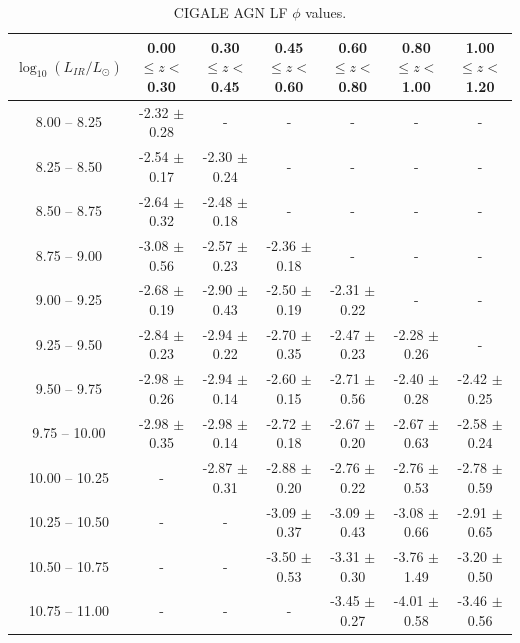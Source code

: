 \begin{landscape}
    \begin{table}
    \begin{center}
    \caption{CIGALE AGN LF $\phi$ values.}
    \label{Tab: CG AGN LF}
    \begin{tabular}{@{}ccccccc@{}}
        \toprule
        $\log_{10}(L_{IR}/L_{\odot})$ & 0.00 $\leq z <$ 0.30 & 0.30 $\leq z <$ 0.45 & 0.45 $\leq z <$ 0.60 & 0.60 $\leq z <$ 0.80 & 0.80 $\leq z <$ 1.00 & 1.00 $\leq z <$ 1.20 \\
        \hline
         8.00 --  8.25 & -2.32 $\pm$ 0.28 & -                & -                & -                & -                & - \\
         8.25 --  8.50 & -2.54 $\pm$ 0.17 & -2.30 $\pm$ 0.24 & -                & -                & -                & - \\
         8.50 --  8.75 & -2.64 $\pm$ 0.32 & -2.48 $\pm$ 0.18 & -                & -                & -                & - \\
         8.75 --  9.00 & -3.08 $\pm$ 0.56 & -2.57 $\pm$ 0.23 & -2.36 $\pm$ 0.18 & -                & -                & - \\
         9.00 --  9.25 & -2.68 $\pm$ 0.19 & -2.90 $\pm$ 0.43 & -2.50 $\pm$ 0.19 & -2.31 $\pm$ 0.22 & -                & - \\
         9.25 --  9.50 & -2.84 $\pm$ 0.23 & -2.94 $\pm$ 0.22 & -2.70 $\pm$ 0.35 & -2.47 $\pm$ 0.23 & -2.28 $\pm$ 0.26 & - \\
         9.50 --  9.75 & -2.98 $\pm$ 0.26 & -2.94 $\pm$ 0.14 & -2.60 $\pm$ 0.15 & -2.71 $\pm$ 0.56 & -2.40 $\pm$ 0.28 & -2.42 $\pm$ 0.25 \\
         9.75 -- 10.00 & -2.98 $\pm$ 0.35 & -2.98 $\pm$ 0.14 & -2.72 $\pm$ 0.18 & -2.67 $\pm$ 0.20 & -2.67 $\pm$ 0.63 & -2.58 $\pm$ 0.24 \\
        10.00 -- 10.25 & -                & -2.87 $\pm$ 0.31 & -2.88 $\pm$ 0.20 & -2.76 $\pm$ 0.22 & -2.76 $\pm$ 0.53 & -2.78 $\pm$ 0.59 \\
        10.25 -- 10.50 & -                & -                & -3.09 $\pm$ 0.37 & -3.09 $\pm$ 0.43 & -3.08 $\pm$ 0.66 & -2.91 $\pm$ 0.65 \\
        10.50 -- 10.75 & -                & -                & -3.50 $\pm$ 0.53 & -3.31 $\pm$ 0.30 & -3.76 $\pm$ 1.49 & -3.20 $\pm$ 0.50 \\
        10.75 -- 11.00 & -                & -                & -                & -3.45 $\pm$ 0.27 & -4.01 $\pm$ 0.58 & -3.46 $\pm$ 0.56 \\

\end{tabular}
\end{center}
\end{table}
\end{landscape}
